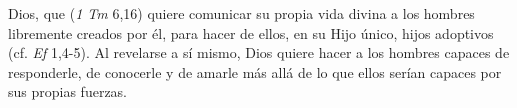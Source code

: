  Dios, que  (\emph{1 Tm} 6,16) quiere comunicar su propia vida divina a los hombres libremente creados por él, para hacer de ellos, en su Hijo único, hijos adoptivos (cf. \emph{Ef} 1,4-5). Al revelarse a sí mismo, Dios quiere hacer a los hombres capaces de responderle, de conocerle y de amarle más allá de lo que ellos serían capaces por sus propias fuerzas.